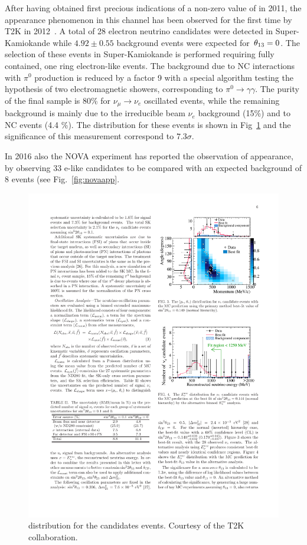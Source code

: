 After having obtained first precious indications of a non-zero value of \thint in 2011,  the \nue appearance phenomenon in this channel has been observed for the first time by T2K in 2012~\cite{Abe:2013hdq}. A total of 28 electron neutrino candidates were detected in Super-Kamiokande while $4.92\pm0.55$ background events were expected for $\textrm \,\theta_{13}=0$. The selection of these events in Super-Kamiokande is performed requiring fully contained, one ring electron-like events. The background due to NC interactions with $\pi^0$ production is reduced by a factor 9 with a special algorithm testing the hypothesis of two electromagnetic showers, corresponding to $\pi^0 \rightarrow \gamma \gamma$. The purity of the final sample is 80\% for $\nu_\mu \rightarrow \nu_e$ oscillated events, while the remaining background is mainly due to the irreducible beam $\nu_e$ background (15\%) and to NC events (4.4 \%). 
The \ptheta distribution for these events is shown in Fig~\ref{fig:t2kapp} and the significance of this measurement correspond to $7.3\sigma$. 

In 2016 also the NOVA experiment has reported the observation of \nue appearance, by observing 33 e-like candidates to be compared with an expected background of 8 events (see Fig.~\ref{fig:novaapp}.

\begin{figure} [htbp!]
\begin{center}
\includegraphics[width=14cm]{figures/nueapp_ptheta.pdf}
\caption{\label{fig:t2kapp} \ptheta distribution for the \nue candidates events. Courtesy of the T2K collaboration.}
\end{center}
\end{figure}



